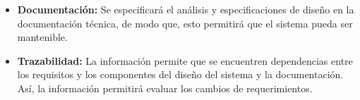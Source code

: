 \begin{itemize}
			\item \textbf{Documentación:} Se especificará el análisis y especificaciones de diseño en la documentación técnica, de modo que, esto permitirá que el sistema pueda ser mantenible.
			
			\item \textbf{Trazabilidad:} La información permite que se encuentren dependencias entre los requisitos y los componentes del diseño del
			sistema y la documentación. Así, la información permitirá evaluar los cambios de requerimientos.
		\end{itemize}
	
